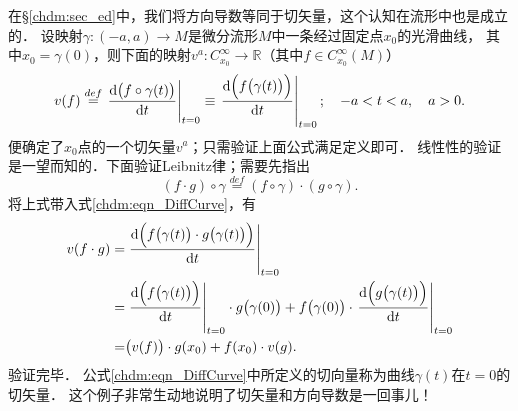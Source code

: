 在\S\ref{chdm:sec_ed}中，我们将方向导数等同于切矢量，这个认知在流形中也是成立的．
设映射$\gamma:(-a,a)\to M$是微分流形$M$中一条经过固定点$x_0$的光滑曲线，
其中$x_0=\gamma(0)$，则下面的映射$v^a:C^\infty_{x_0}\to \mathbb{R}$（其中$f\in C_{x_0}^\infty(M)$）
\begin{equation}\label{chdm:eqn_DiffCurve}
    v(f)\overset{def}{=} \left. \frac{{\rm d} \bigl(f \circ \gamma (t)\bigr)}{{\rm d} t} \right |_{t=0}
    \equiv \left. \frac{{\rm d} \Bigl(f \bigl(\gamma (t)\bigr)\Bigr)}{{\rm d} t} \right |_{t=0};
    \quad -a < t < a, \quad a>0.
\end{equation}
便确定了$x_0$点的一个切矢量$v^a$；只需验证上面公式满足定义即可．
线性性的验证是一望而知的．下面验证Leibnitz律；需要先指出
\begin{equation}\label{chdm:eqn_f-cdot-g-circo-gamma}
    (f\cdot g)\circ \gamma \overset{def}{=} (f\circ \gamma) \cdot (g\circ \gamma)  .
\end{equation}
将上式带入式\eqref{chdm:eqn_DiffCurve}，有
\begin{align*}
    v(f\cdot g)=& \left. \frac{{\rm d} \Bigl(f \bigl(\gamma (t)\bigr)\cdot 
        g \bigl(\gamma (t)\bigr)\Bigr)}{{\rm d} t} \right |_{t=0} \\
    =& \left. \frac{{\rm d} \Bigl(f \bigl(\gamma (t)\bigr)
        \Bigr)}{{\rm d} t} \right |_{t=0} \cdot g \bigl(\gamma (0)\bigr) +
      f \bigl(\gamma (0)\bigr)\cdot \left. \frac{{\rm d} \Bigl( 
        g \bigl(\gamma (t)\bigr)\Bigr)}{{\rm d} t} \right |_{t=0} \\
    =& \bigl(v(f)\bigr)\cdot g(x_0)+ f(x_0)\cdot v (g) .
\end{align*}
验证完毕．
公式\eqref{chdm:eqn_DiffCurve}中所定义的切向量称为曲线$\gamma(t)$在$t=0$的{\heiti 切矢量}．
这个例子非常生动地说明了切矢量和方向导数是一回事儿！

